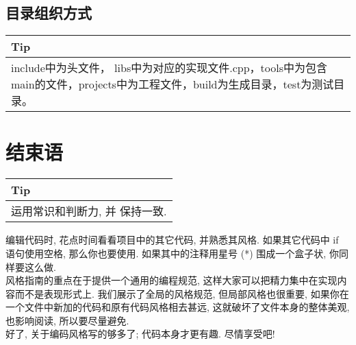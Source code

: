 \documentclass[a4paper,11pt,CJK]{article}
\begin{document}
\begin{CJK}{UTF8}{gbsn}
\subsection{目录组织方式}
\begin{table}[htbp]
\flushleft
\begin{tabular}{p{400pt}}
\toprule
\rowcolor[gray]{.8} Tip \\
\midrule
include中为头文件， libs中为对应的实现文件.cpp，tools中为包含main的文件，projects中为工程文件，build为生成目录，test为测试目录。\\
\bottomrule
\end{tabular}
\end{table}

\section{结束语}
\begin{table}[htbp]
\flushleft
\begin{tabular}{p{400pt}}
\toprule
\rowcolor[gray]{.8} Tip \\
\midrule
运用常识和判断力, 并 保持一致.\\
\bottomrule
\end{tabular}
\end{table}
编辑代码时, 花点时间看看项目中的其它代码, 并熟悉其风格. 如果其它代码中 if 语句使用空格, 那么你也要使用. 如果其中的注释用星号 (*) 围成一个盒子状, 你同样要这么做.\\
\indent
风格指南的重点在于提供一个通用的编程规范, 这样大家可以把精力集中在实现内容而不是表现形式上. 我们展示了全局的风格规范, 但局部风格也很重要, 如果你在一个文件中新加的代码和原有代码风格相去甚远, 这就破坏了文件本身的整体美观, 也影响阅读, 所以要尽量避免.\\
\indent
好了, 关于编码风格写的够多了; 代码本身才更有趣. 尽情享受吧!

\end{CJK}
\end{document}
